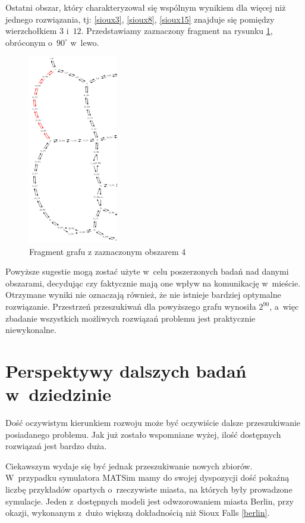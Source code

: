 \documentclass[twoside,12pt]{report}
\begin{document}
Ostatni obszar, który charakteryzował się wspólnym wynikiem dla więcej niż jednego rozwiązania, tj: \ref{sioux3}, \ref{sioux8}, \ref{sioux15} znajduje się pomiędzy wierzchołkiem $3$ i~$12$. Przedstawiamy zaznaczony fragment na rysunku \ref{frag_4}, obróconym o~$90^{\circ}$ w~lewo.

\begin{figure}[ht]
\centering
\includegraphics[width=0.35\textwidth, angle=90]{img/sioux-out/obszar4}
\caption{Fragment grafu z zaznaczonym obszarem 4}
\label{frag_4}
\end{figure}

Powyższe sugestie mogą zostać użyte w~celu poszerzonych badań nad danymi obszarami, decydując czy faktycznie mają one wpływ na komunikację w~mieście. Otrzymane wyniki nie oznaczają również, że nie istnieje bardziej optymalne rozwiązanie. Przestrzeń przeszukiwań dla powyższego grafu wynosiła $2^{90}$, a~więc zbadanie wszystkich możliwych rozwiązań problemu jest praktycznie niewykonalne.

\section{Perspektywy dalszych badań w~dziedzinie}
Dość oczywistym kierunkiem rozwoju może być oczywiście dalsze przeszukiwanie posiadanego problemu. Jak już zostało wspomniane wyżej, ilość dostępnych rozwiązań jest bardzo duża.

Ciekawszym wydaje się być jednak przeszukiwanie nowych zbiorów. W~przypadku symulatora MATSim mamy do swojej dyspozycji dość pokaźną liczbę przykładów opartych o~rzeczywiste miasta, na których były prowadzone symulacje. Jeden z~dostępnych modeli jest odwzorowaniem miasta Berlin, przy okazji, wykonanym z~dużo większą dokładnością niż Sioux Falls \ref{berlin}.
\end{document}
